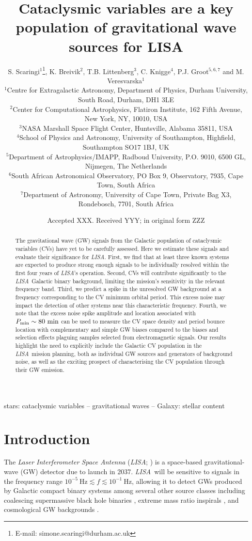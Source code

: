 \documentclass[fleqn,usenatbib]{mnras}
\title[LISA CVs]{Cataclysmic variables are a key population of gravitational wave sources for LISA}
\author[S. Scaringi et al.]{
S. Scaringi$^{1}$\thanks{E-mail: simone.scaringi@durham.ac.uk},
K. Breivik$^{2}$,
T.B. Littenberg$^{3}$,
C. Knigge$^{4}$,
P.J. Groot$^{5,6,7}$ and
M. Veresvarska$^{1}$
\\
$^{1}$Centre for Extragalactic Astronomy, Department of Physics, Durham University, South Road, Durham, DH1 3LE\\
$^{2}$Center for Computational Astrophysics, Flatiron Institute, 162 Fifth Avenue, New York, NY, 10010, USA\\
$^{3}$NASA Marshall Space Flight Center, Huntsville, Alabama 35811, USA\\
$^{4}$School of Physics and Astronomy, University of Southampton, Highfield, Southampton SO17 1BJ, UK\\
$^{5}$Department of Astrophysics/IMAPP, Radboud University, P.O. 9010, 6500 GL, Nijmegen, The Netherlands\\
$^{6}$South African Astronomical Observatory, PO Box 9, Observatory, 7935, Cape Town, South Africa\\
$^{7}$Department of Astronomy, University of Cape Town, Private Bag X3, Rondebosch, 7701, South Africa\\
}
\date{Accepted XXX. Received YYY; in original form ZZZ}
\newcommand{\lisa}{{\it LISA}}
\begin{document}
\maketitle

\begin{abstract}
The gravitational wave (GW) signals from the Galactic population of cataclysmic variables (CVs) have yet to be carefully assessed. Here we estimate these signals and evaluate their significance for \lisa. First, we find that at least three known systems are expected to produce strong enough signals to be individually resolved within the first four years of \lisa's operation. Second, CVs will contribute significantly to the \lisa\ Galactic binary background, limiting the mission's sensitivity in the relevant frequency band. Third, we predict a spike in the unresolved GW background at a frequency corresponding to the CV minimum orbital period. This excess noise may impact the detection of other systems near this characteristic frequency. Fourth, we note that the excess noise spike amplitude and location associated with $P_{\rm{min}}\sim80~\mathrm{min}$ can be used to measure the CV space density and period bounce location with complementary and simple GW biases compared to the biases and selection effects plaguing samples selected from electromagnetic signals. Our results highlight the need to explicitly include the Galactic CV population in the \lisa\ mission planning, both as individual GW sources and generators of background noise, as well as the exciting prospect of characterising the CV population through their GW emission.
\end{abstract}
    
    
\begin{keywords}
    stars: cataclysmic variables -- gravitational waves -- Galaxy: stellar content 
\end{keywords}


\section{Introduction}
\label{sec:intro}

The \textit{Laser Interferometer Space Antenna} (\lisa; \citealt{lisa17}) is a space-based gravitational-wave (GW) detector due to launch in 2037. \lisa\ will be sensitive to signals in the frequency range $10^{-5}~\mathrm{Hz} \lesssim f \lesssim 10^{-1}~\mathrm{Hz}$, allowing 
it to detect GWs produced by Galactic compact binary systems among several other source classes including coalescing supermassive black hole binaries \citep[e.g.][]{Klein2016, Bellovary2019}, extreme mass ratio inspirals \citep[e.g.][]{Berti2006, Barack2007}, and cosmological GW backgrounds \citep[][]{Caprini2016, Bartolo2016}.
\end{document}
